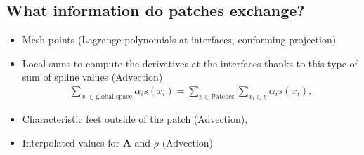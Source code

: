 \documentclass[presentation.tex]{subfiles}
\begin{document}
\subsection{What information do patches exchange?}
\begin{itemize}
    \item Mesh-points (Lagrange polynomials at interfaces, 
            conforming projection)
    \item Local sums to compute the derivatives at the interfaces thanks to this 
        type of sum of spline values (Advection)
            \begin{align*}
                \sum_{x_i \in \text{global space}} \alpha_i s(x_i) = \sum_{p \in\text{Patches}} 
                        \sum_{x_i \in p} \alpha_i s(x_i),
            \end{align*}
    \item Characteristic feet outside of the patch (Advection),
    \item Interpolated values for $\mathbf{A}$ and $\rho$ (Advection)
\end{itemize}
\end{document}
